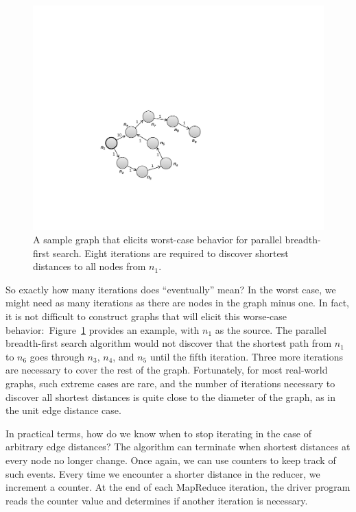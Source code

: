 \begin{figure}[t]
\begin{center}
\vspace{0.2cm}
\includegraphics[scale=0.6]{figures/fig-ch5-screwy-graph.pdf}
\vspace{-0.3cm}
\end{center}
\caption{A sample graph that elicits worst-case behavior for parallel
  breadth-first search.  Eight iterations are required to discover
  shortest distances to all nodes from $n_1$.}
\label{figure:chapter-graphs:screwy-graph}
\end{figure}

So exactly how many iterations does ``eventually'' mean?  In the worst
case, we might need as many iterations as there are nodes in the graph
minus one.  In fact, it is not difficult to construct graphs that will
elicit this worse-case
behavior:\ Figure~\ref{figure:chapter-graphs:screwy-graph} provides an
example, with $n_1$ as the source.  The parallel breadth-first search
algorithm would not discover that the shortest path from $n_1$ to
$n_6$ goes through $n_3$, $n_4$, and $n_5$ until the fifth iteration.
Three more iterations are necessary to cover the rest of the graph.
Fortunately, for most real-world graphs, such extreme cases are rare,
and the number of iterations necessary to discover all shortest
distances is quite close to the diameter of the graph, as in the unit
edge distance case.

In practical terms, how do we know when to stop iterating in the case
of arbitrary edge distances?  The algorithm can terminate when
shortest distances at every node no longer change.  Once again, we can
use counters to keep track of such events.  Every time we encounter a
shorter distance in the reducer, we increment a counter.  At the end
of each MapReduce iteration, the driver program reads the counter
value and determines if another iteration is necessary.

